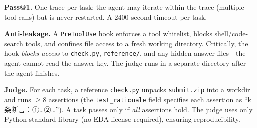 \textbf{Pass@1.} One trace per task: the agent may iterate within the trace (multiple tool calls) but is never restarted. A 2400-second timeout per task.

\textbf{Anti-leakage.} A \texttt{PreToolUse} hook enforces a tool whitelist, blocks shell/code-search tools, and confines file access to a fresh working directory. Critically, the hook \emph{blocks access} to \texttt{check.py}, \texttt{reference/}, and any hidden answer files---the agent cannot read the answer key. The judge runs in a separate directory after the agent finishes.

\textbf{Judge.} For each task, a reference \texttt{check.py} unpacks \texttt{submit.zip} into a workdir and runs $\geq 8$ assertions (the \texttt{test\_rationale} field specifies each assertion as ``k 条断言：①…②…''). A task passes only if \emph{all} assertions hold. The judge uses only Python standard library (no EDA license required), ensuring reproducibility.
